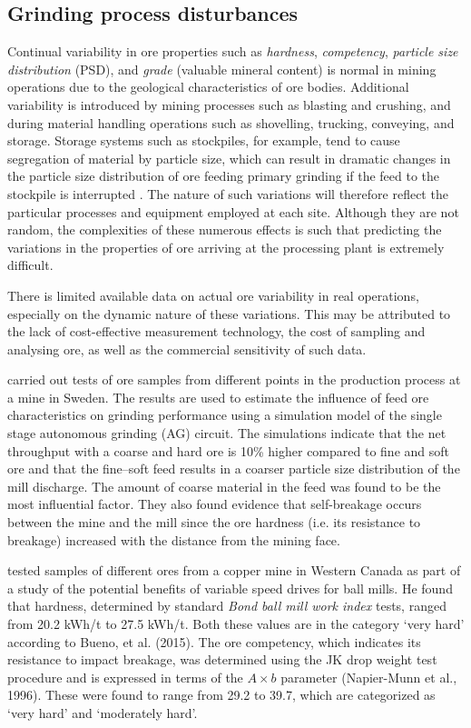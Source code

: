 \subsection{Grinding process disturbances}

Continual variability in ore properties such as \textit{hardness}, \textit{competency}, \textit{particle size distribution} (PSD), and \textit{grade} (valuable mineral content) is normal in mining operations due to the geological characteristics of ore bodies. Additional variability is introduced by mining processes such as blasting and crushing, and during material handling operations such as shovelling, trucking, conveying, and storage. Storage systems such as stockpiles, for example, tend to cause segregation of material by particle size, which can result in dramatic changes in the particle size distribution of ore feeding primary grinding if the feed to the stockpile is interrupted \citep{estrada_hybrid_2014}. The nature of such variations will therefore reflect the particular processes and equipment employed at each site. Although they are not random, the complexities of these numerous effects is such that predicting the variations in the properties of ore arriving at the processing plant is extremely difficult.

There is limited available data on actual ore variability in real operations, especially on the dynamic nature of these variations. This may be attributed to the lack of cost-effective measurement technology, the cost of sampling and analysing ore, as well as the commercial sensitivity of such data.

\cite{hahne_ore_2003} carried out tests of ore samples from different points in the production process at a mine in Sweden. The results are used to estimate the influence of feed ore characteristics on grinding performance using a simulation model of the single stage autonomous grinding (AG) circuit. The simulations indicate that the net throughput with a coarse and hard ore is 10\% higher compared to fine and soft ore and that the fine–soft feed results in a coarser particle size distribution of the mill discharge. The amount of coarse material in the feed was found to be the most influential factor. They also found evidence that self-breakage occurs between the mine and the mill since the ore hardness (i.e. its resistance to breakage) increased with the distance from the mining face.

\cite{liu_development_2018} tested samples of different ores from a copper mine in Western Canada as part of a study of the potential benefits of variable speed drives for ball mills. He found that hardness, determined by standard \textit{Bond ball mill work index} tests, ranged from 20.2 kWh/t to 27.5 kWh/t. Both these values are in the category `very hard' according to Bueno, et al. (2015). The ore competency, which indicates its resistance to impact breakage, was determined using the JK drop weight test procedure and is expressed in terms of the $A\times{b}$ parameter (Napier-Munn et al., 1996). These were found to range from 29.2 to 39.7, which are categorized as `very hard' and `moderately hard'.

